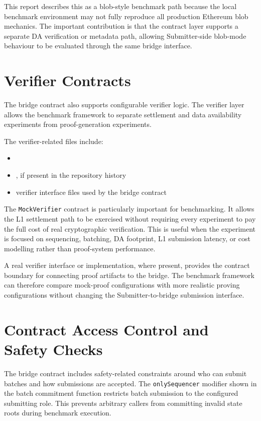 This report describes this as a blob-style benchmark path because the local benchmark environment may not fully reproduce all production Ethereum blob mechanics. The important contribution is that the contract layer supports a separate DA verification or metadata path, allowing Submitter-side blob-mode behaviour to be evaluated through the same bridge interface.

\section{Verifier Contracts}

The bridge contract also supports configurable verifier logic. The verifier layer allows the benchmark framework to separate settlement and data availability experiments from proof-generation experiments.

The verifier-related files include:

\begin{itemize}
    \item {}
    \item {}, if present in the repository history
    \item verifier interface files used by the bridge contract
\end{itemize}

The \texttt{MockVerifier} contract is particularly important for benchmarking. It allows the L1 settlement path to be exercised without requiring every experiment to pay the full cost of real cryptographic verification. This is useful when the experiment is focused on sequencing, batching, DA footprint, L1 submission latency, or cost modelling rather than proof-system performance.

A real verifier interface or implementation, where present, provides the contract boundary for connecting proof artifacts to the bridge. The benchmark framework can therefore compare mock-proof configurations with more realistic proving configurations without changing the Submitter-to-bridge submission interface.

\section{Contract Access Control and Safety Checks}

The bridge contract includes safety-related constraints around who can submit batches and how submissions are accepted. The \texttt{onlySequencer} modifier shown in the batch commitment function restricts batch submission to the configured submitting role. This prevents arbitrary callers from committing invalid state roots during benchmark execution.

